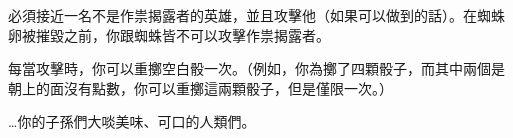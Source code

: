 必須接近一名不是作祟揭露者的英雄，並且攻擊他（如果可以做到的話）。在蜘蛛卵被摧毀之前，你跟蜘蛛皆不可以攻擊作祟揭露者。

每當攻擊時，你可以重擲空白骰一次。（例如，你為擲了四顆骰子，而其中兩個是朝上的面沒有點數，你可以重擲這兩顆骰子，但是僅限一次。）

\begin{HauntStory}
	…你的子孫們大啖美味、可口的人類們。
\end{HauntStory}
